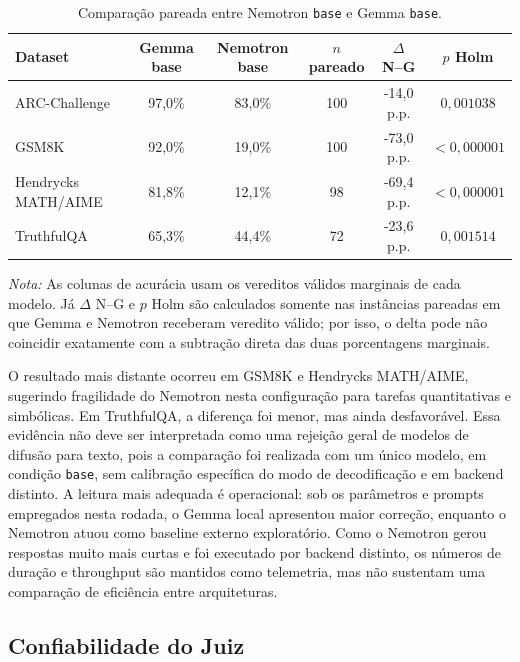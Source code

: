 \documentclass[12pt]{article}
\begin{document}
\begin{table}[H]
\centering
\scriptsize
\setlength{\tabcolsep}{4pt}
\renewcommand{\arraystretch}{1.15}
\caption{Comparação pareada entre Nemotron \texttt{base} e Gemma \texttt{base}.}
\label{tab:nemotron-final}
\begin{tabular}{|p{3.2cm}|c|c|c|c|c|}
\hline
\textbf{Dataset} & \textbf{Gemma base} & \textbf{Nemotron base} & \textbf{\(n\) pareado} & \textbf{\(\Delta\) N--G} & \textbf{\(p\) Holm} \\
\hline
ARC-Challenge & 97,0\% & 83,0\% & 100 & -14,0 p.p. & \(0{,}001038\) \\
GSM8K & 92,0\% & 19,0\% & 100 & -73,0 p.p. & \(<0{,}000001\) \\
Hendrycks MATH/AIME & 81,8\% & 12,1\% & 98 & -69,4 p.p. & \(<0{,}000001\) \\
TruthfulQA & 65,3\% & 44,4\% & 72 & -23,6 p.p. & \(0{,}001514\) \\
\hline
\end{tabular}
\vspace{2pt}

\footnotesize\textit{Nota:} As colunas de acurácia usam os vereditos válidos marginais de cada modelo. Já \(\Delta\) N--G e \(p\) Holm são calculados somente nas instâncias pareadas em que Gemma e Nemotron receberam veredito válido; por isso, o delta pode não coincidir exatamente com a subtração direta das duas porcentagens marginais.
\end{table}

O resultado mais distante ocorreu em GSM8K e Hendrycks MATH/AIME, sugerindo fragilidade do Nemotron nesta configuração para tarefas quantitativas e simbólicas. Em TruthfulQA, a diferença foi menor, mas ainda desfavorável. Essa evidência não deve ser interpretada como uma rejeição geral de modelos de difusão para texto, pois a comparação foi realizada com um único modelo, em condição \texttt{base}, sem calibração específica do modo de decodificação e em backend distinto. A leitura mais adequada é operacional: sob os parâmetros e prompts empregados nesta rodada, o Gemma local apresentou maior correção, enquanto o Nemotron atuou como baseline externo exploratório. Como o Nemotron gerou respostas muito mais curtas e foi executado por backend distinto, os números de duração e throughput são mantidos como telemetria, mas não sustentam uma comparação de eficiência entre arquiteturas.

\FloatBarrier
\subsection{Confiabilidade do Juiz}
\end{document}
